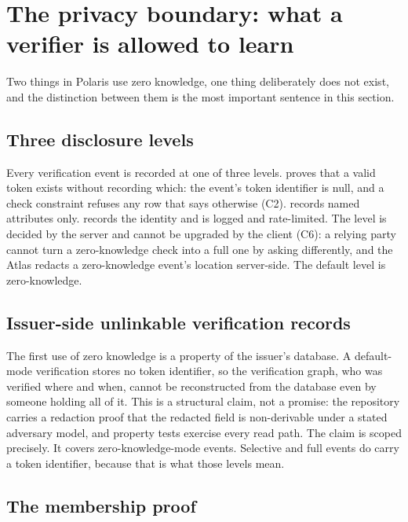 \section{The privacy boundary: what a verifier is allowed to learn}
\label{sec:privacy}

Two things in Polaris use zero knowledge, one thing deliberately does not exist, and the distinction
between them is the most important sentence in this section.

\subsection{Three disclosure levels}

Every verification event is recorded at one of three levels.  proves that a
valid token exists without recording which: the event's token identifier is null, and a check
constraint refuses any row that says otherwise (C2).  records named attributes only.
 records the identity and is logged and rate-limited. The level is decided by the server
and cannot be upgraded by the client (C6): a relying party cannot turn a zero-knowledge check into a
full one by asking differently, and the Atlas redacts a zero-knowledge event's location server-side.
The default level is zero-knowledge. \sImpl

\subsection{Issuer-side unlinkable verification records}

The first use of zero knowledge is a property of the issuer's database. A default-mode verification
stores no token identifier, so the verification graph, who was verified where and when, cannot be
reconstructed from the database even by someone holding all of it. This is a structural claim, not a
promise: the repository carries a redaction proof that the redacted field is non-derivable under a
stated adversary model, and property tests exercise every read path. The claim is scoped precisely.
It covers zero-knowledge-mode events. Selective and full events do carry a token identifier, because
that is what those levels mean. \sImpl

\subsection{The membership proof}

